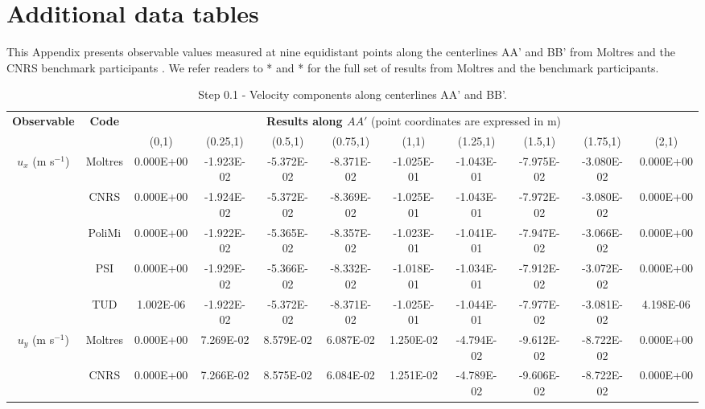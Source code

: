 \appendix
\section{Additional data tables} \label{appendix:tables}

This Appendix presents observable values measured at nine
equidistant points along the centerlines AA' and BB' from Moltres and the
CNRS benchmark participants \cite{tiberga_results_2020}. We refer readers to
* and * for the full set of results from Moltres and the benchmark
participants. 

\begin{table}[htbp!]
	\caption{Step 0.1 - Velocity components along centerlines AA' and BB'.}
	\centering
	\footnotesize
	\setlength\tabcolsep{1.5pt}
	\hspace*{-2cm}
	\renewcommand{\arraystretch}{.8}
	\begin{tabular}{c c c c c c c c c c c}
		\toprule
		\multirow{2}{*}{\textbf{Observable}} & \multirow{2}{*}{\textbf{Code}} & \multicolumn{9}{c}{\textbf{Results along $AA'$} (point coordinates are expressed in m)} \\
		& & {(0,1)} & {(0.25,1)} & {(0.5,1)} & {(0.75,1)} & {(1,1)} & {(1.25,1)} & {(1.5,1)} & {(1.75,1)} & {(2,1)} \\
		\midrule
		\multirow{5}{*}{$u_x$ (m s$^{-1}$)} & Moltres & 0.000E+00 & -1.923E-02 & -5.372E-02 & -8.371E-02 & -1.025E-01 & -1.043E-01 & -7.975E-02 & -3.080E-02 & 0.000E+00 \\
		& CNRS & 0.000E+00 & -1.924E-02 & -5.372E-02 & -8.369E-02 & -1.025E-01 & -1.043E-01 & -7.972E-02 & -3.080E-02 & 0.000E+00 \\
        & PoliMi & 0.000E+00 & -1.922E-02 & -5.365E-02 & -8.357E-02 & -1.023E-01 & -1.041E-01 & -7.947E-02 & -3.066E-02 & 0.000E+00 \\
        & PSI & 0.000E+00 & -1.929E-02 & -5.366E-02 & -8.332E-02 & -1.018E-01 & -1.034E-01 & -7.912E-02 & -3.072E-02 & 0.000E+00 \\
        & TUD & 1.002E-06 & -1.922E-02 & -5.372E-02 & -8.371E-02 & -1.025E-01 & -1.044E-01 & -7.977E-02 & -3.081E-02 & 4.198E-06 \\
        \midrule
		\multirow{5}{*}{$u_y$ (m s$^{-1}$)} & Moltres & 0.000E+00 & 7.269E-02 & 8.579E-02 & 6.087E-02 & 1.250E-02 & -4.794E-02 & -9.612E-02 & -8.722E-02 & 0.000E+00\\
		& CNRS & 0.000E+00 & 7.266E-02 & 8.575E-02 & 6.084E-02 & 1.251E-02 & -4.789E-02 & -9.606E-02 & -8.722E-02 & 0.000E+00 \\

\end{tabular}
\end{table}
